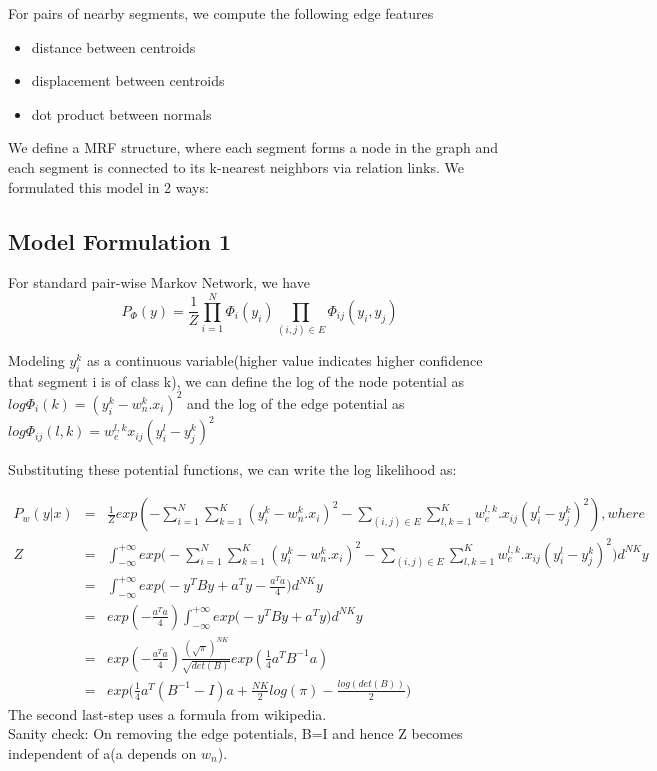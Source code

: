 \documentclass[11pt]{article} %
\begin{document}
For pairs of nearby segments, we compute the following edge features
\begin{itemize}
\item distance between centroids
\item displacement between centroids
\item dot product between normals
\end{itemize}

 We define a MRF structure, where each segment forms a node in the graph and each segment is connected to its k-nearest neighbors via relation links. We formulated this model in 2 ways:
 
\subsection{Model Formulation 1}
For standard pair-wise Markov Network, we have 
\begin{equation}
  P_\Phi (y) = \frac{1}{Z} \prod_{i=1}^{N} \Phi_i(y_i) \prod_{(i,j)\in E} \Phi_{ij}(y_i,y_j)
  \end{equation}

Modeling $y_i^k$ as a continuous variable(higher value indicates higher confidence that segment i is of class k), we can define the log of the node potential as 
$ log \Phi_i(k) = (y_i^k -  w_n^k.x_i )^2$  and the log of the edge potential as $ log \Phi_{ij}(l,k) = w_e^{l,k}x_{ij} ( y_i^l -  y_j^k)^2$

Substituting these potential functions, we can write the log likelihood as: 

\begin{eqnarray*}
P_w (y|x) &=& \frac{1}{Z}exp(-\sum_{i=1}^{N} \sum_{k=1}^{K} (y_i^k - w^{k}_{n}.x_{i})^2 - \sum_{(i,j)\in E} \sum_{l,k=1}^{K} w_{e}^{l,k}.x_{ij}(y_i^l - y_j^k)^2), where\\
Z&=&\int_{-\infty}^{+\infty }{exp \bigg( - \sum_{i=1}^{N} \sum_{k=1}^{K} (y_i^k - w^{k}_{n}.x_{i})^2 - \sum_{(i,j)\in E} \sum_{l,k=1}^{K} w_{e}^{l,k}.x_{ij}(y_i^l - y_j^k)^2 \bigg) } d^{NK}y\\
&=&\int_{-\infty}^{+\infty }{exp \bigg(-y^T B y+a^T y-\frac{a^Ta}{4}\bigg) } d^{NK}y\\
&=&exp(-\frac{a^Ta}{4})\int_{-\infty}^{+\infty }{exp \bigg(-y^T B y+a^T y\bigg) } d^{NK}y\\
&=&exp(-\frac{a^Ta}{4})\frac{(\sqrt{\pi})^{NK}}{\sqrt{det(B)}}exp(\frac{1}{4}a^T B^{-1} a)\\
&=&exp\bigg(\frac{1}{4}a^T (B^{-1}-I) a+\frac{NK}{2}log(\pi)-\frac{log(det(B))}{2}\bigg)
\end{eqnarray*}
The second last-step uses a formula from wikipedia. \\
Sanity check: On removing the edge potentials, B=I and hence Z becomes independent of a(a depends on $w_n$).
\end{document}
